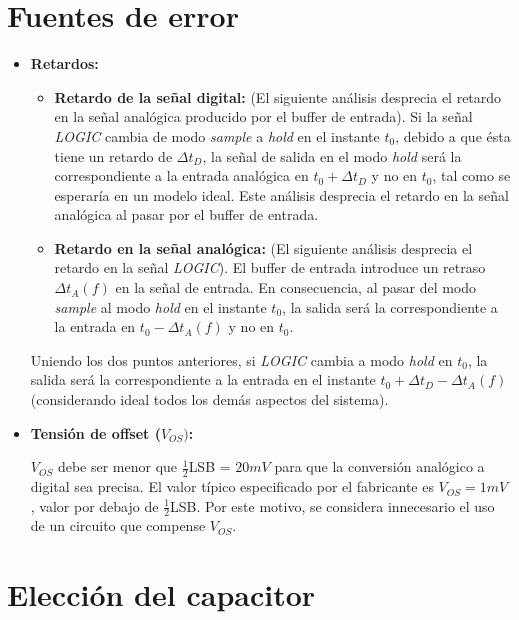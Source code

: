 \documentclass[../../ASSD_TP1_G7.tex]{subfiles}
\begin{document}
\section{Fuentes de error}
\begin{itemize}
	\item \textbf{Retardos:}
	\begin{itemize}
		\item \textbf{Retardo de la se\~nal digital:} (El siguiente an\'alisis desprecia el retardo en la se\~nal anal\'ogica producido por el buffer de entrada). Si la se\~nal \textit{LOGIC} cambia de modo \textit{sample} a \textit{hold} en el instante $t_0$, debido a que \'esta tiene un retardo de $\Delta t_D$, la se\~nal de salida en el modo \textit{hold} ser\'a la correspondiente a la entrada anal\'ogica en $t_0 + \Delta t_D$ y no en $t_0$, tal como se esperar\'ia en un modelo ideal. Este an\'alisis desprecia el retardo en la se\~nal anal\'ogica al pasar por el buffer de entrada.
		\item \textbf{Retardo en la se\~nal anal\'ogica:} (El siguiente an\'alisis desprecia el retardo en la se\~nal \textit{LOGIC}). El buffer de entrada introduce un retraso $\Delta t_A(f)$ en la se\~nal de entrada. En consecuencia, al pasar del modo \textit{sample} al modo \textit{hold} en el instante $t_0$, la salida  ser\'a la correspondiente a la entrada  en $t_0 - \Delta t_A(f)$ y no en $t_0$.
	\end{itemize}
	Uniendo los dos puntos anteriores, si \textit{LOGIC} cambia a modo \textit{hold} en $t_0$, la salida ser\'a la correspondiente a la entrada en el instante $t_0 + \Delta t_D - \Delta t_A(f)$ (considerando ideal todos los dem\'as aspectos del sistema).
	
	\item \textbf{Tensi\'on de offset ($V_{OS})$:}
	
	$V_{OS}$ debe ser menor que $\frac{1}{2}$LSB = $20mV$ para que la conversi\'on anal\'ogico a digital sea precisa.  
	El valor t\'ipico especificado por el fabricante es $V_{OS} = 1mV$, valor por debajo de $\frac{1}{2}$LSB. Por este motivo, se considera innecesario el uso de un circuito que compense $V_{OS}$. 
\end{itemize}


\section{Elecci\'on del capacitor}
\end{document}
